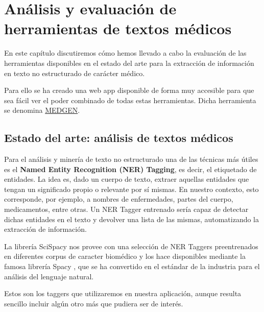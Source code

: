 \chapter{Análisis y evaluación de \\herramientas de textos médicos}

En este capítulo discutiremos cómo hemos llevado a cabo la evaluación de las herramientas disponibles en el estado del arte para la extracción de información en texto no estructurado de carácter médico.

Para ello se ha creado una web app disponible de forma muy accesible para que sea fácil ver el poder combinado de todas estas herramientas. Dicha herramienta se denomina \href{https://share.streamlit.io/jesi-rgb/medical-text-analysis/src/streamlit_gen_test.py}{MEDGEN}.

\section{Estado del arte: análisis de textos médicos}

Para el análisis y minería de texto no estructurado una de las técnicas más útiles es el \textbf{Named Entity Recognition (NER) Tagging}, es decir, el etiquetado de entidades. La idea es, dado un cuerpo de texto, extraer aquellas entidades que tengan un significado propio o relevante por sí mismas. En nuestro contexto, esto corresponde, por ejemplo, a nombres de enfermedades, partes del cuerpo, medicamentos, entre otras. Un NER Tagger entrenado sería capaz de detectar dichas entidades en el texto y devolver una lista de las mismas, automatizando la extracción de información.

La librería SciSpacy \cite{neumann-etal-2019-scispacy} nos provee con una selección de NER Taggers preentrenados en diferentes corpus de caracter biomédico y los hace disponibles mediante la famosa librería Spacy \cite{spacy}, que se ha convertido en el estándar de la industria para el análisis del lenguaje natural.

Estos son los taggers que utilizaremos en nuestra aplicación, aunque resulta sencillo incluir algún otro más que pudiera ser de interés.

